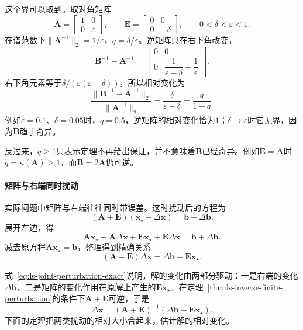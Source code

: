 这个界可以取到。取对角矩阵
\[
 \bm A=\begin{bmatrix}1&0\\0&\varepsilon\end{bmatrix},\qquad
 \bm E=\begin{bmatrix}0&0\\0&-\delta\end{bmatrix},\qquad 0<\delta<\varepsilon<1 .
\]
在谱范数下$\lVert\bm A^{-1}\rVert_2=1/\varepsilon$，$q=\delta/\varepsilon$。逆矩阵只在右下角改变，
\[
 \bm B^{-1}-\bm A^{-1}=\begin{bmatrix}0&0\\0&\dfrac1{\varepsilon-\delta}-\dfrac1\varepsilon\end{bmatrix}.
\]
右下角元素等于$\delta/(\varepsilon(\varepsilon-\delta))$，所以相对变化为
\[
 \frac{\lVert\bm B^{-1}-\bm A^{-1}\rVert_2}{\lVert\bm A^{-1}\rVert_2}=\frac{\delta}{\varepsilon-\delta}=\frac q{1-q}.
\]
例如$\varepsilon=0.1$、$\delta=0.05$时，$q=0.5$，逆矩阵的相对变化恰为$1$；$\delta\to\varepsilon$时它无界，因为$\bm B$趋于奇异。

反过来，$q\geq1$只表示定理不再给出保证，并不意味着$\bm B$已经奇异。例如$\bm E=\bm A$时$q=\kappa(\bm A)\geq1$，而$\bm B=2\bm A$仍可逆。

\paragraph{矩阵与右端同时扰动}
实际问题中矩阵与右端往往同时带误差。这时扰动后的方程为
\[
 (\bm A+\bm E)(\bm x_\star+\Delta\bm x)=\bm b+\Delta\bm b .
\]
展开左边，得
\[
 \bm A\bm x_\star+\bm A\Delta\bm x+\bm E\bm x_\star+\bm E\Delta\bm x=\bm b+\Delta\bm b .
\]
减去原方程$\bm A\bm x_\star=\bm b$，整理得到精确关系
\begin{equation}
 (\bm A+\bm E)\Delta\bm x=\Delta\bm b-\bm E\bm x_\star .
 \label{eq:ls-joint-perturbation-exact}
\end{equation}

式~\eqref{eq:ls-joint-perturbation-exact}说明，解的变化由两部分驱动：一是右端的变化$\Delta\bm b$，二是矩阵的变化作用在原解上产生的$\bm E\bm x_\star$。在定理~\ref{thm:ls-inverse-finite-perturbation}的条件下$\bm A+\bm E$可逆，于是
\[
 \Delta\bm x=(\bm A+\bm E)^{-1}(\Delta\bm b-\bm E\bm x_\star).
\]
下面的定理把两类扰动的相对大小合起来，估计解的相对变化。


